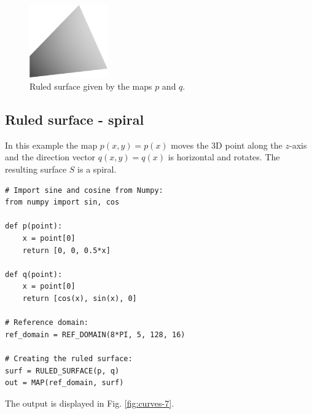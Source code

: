 \begin{figure}[!ht]
\begin{center}
\includegraphics[width=0.3\textwidth]{img/curves-6.png}
\end{center}
\vspace{-4mm}
\caption{Ruled surface given by the maps $p$ and $q$.}
\label{fig:curves-6}
\end{figure}

\subsection{Ruled surface - spiral}

In this example the map $p(x, y) = p(x)$ moves the 3D point 
along the $z$-axis and the direction vector $q(x, y) = q(x)$ 
is horizontal and rotates. The resulting surface $S$ is a spiral.\\

\begin{bbox}
\begin{verbatim}
# Import sine and cosine from Numpy:
from numpy import sin, cos

def p(point):
    x = point[0]
    return [0, 0, 0.5*x]
  
def q(point):
    x = point[0]
    return [cos(x), sin(x), 0]

# Reference domain:  
ref_domain = REF_DOMAIN(8*PI, 5, 128, 16)

# Creating the ruled surface:
surf = RULED_SURFACE(p, q)
out = MAP(ref_domain, surf)
\end{verbatim}
\end{bbox}
\vspace{6mm}

\noindent
The output is displayed in Fig. \ref{fig:curves-7}.\\


